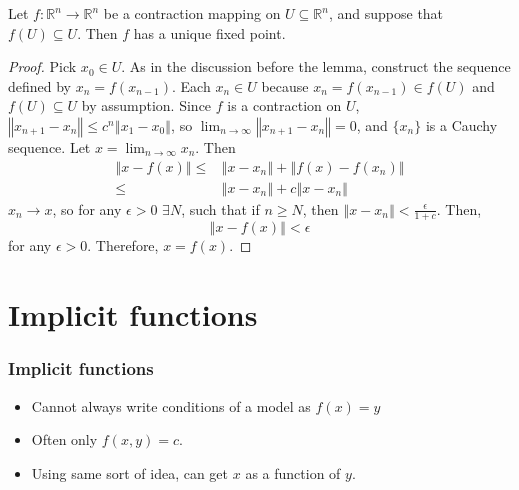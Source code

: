 \documentclass[compress]{beamer}
\def\R{\mathbb{R}}
\newcommand{\norm}[1]{\left\Vert {#1} \right\Vert}
\renewcommand{\to}{{\rightarrow}}
\begin{document}
\begin{frame}
  \begin{lemma}
    Let $f: \R^n \to \R^n$ be a contraction mapping on $U \subseteq
    \R^n$, and suppose that $f(U) \subseteq U$.  Then $f$ has a unique
    fixed point.
  \end{lemma}
  \begin{proof}
    Pick $x_0 \in U$. As in the discussion before the lemma, construct
    the sequence defined by $x_n = f(x_{n-1})$. Each $x_n \in U$ because
    $x_n = f(x_{n-1}) \in f(U)$ and $f(U) \subseteq U$ by
    assumption. Since $f$ is a contraction on $U$, $\norm{x_{n+1} - x_{n}}
    \leq c^n \norm{x_1 - x_0}$, so $\lim_{n \to \infty} \norm{x_{n+1} -
      x_{n}} = 0$, and $\{x_n\}$ is a Cauchy sequence. Let $x = \lim_{n
      \to \infty} x_n$. Then 
    \begin{align*}
      \norm{x - f(x)} \leq & \norm{x - x_n} + \norm{f(x) - f(x_n)} \\
      \leq & \norm{x - x_n} + c\norm{x - x_n}
    \end{align*}
    $x_n \to x$, so for any $\epsilon > 0$ $\exists N$, such that if $n
    \geq N$, then $\norm{x - x_n} < \frac{\epsilon}{1+c}$. Then,
    \[ \norm{x - f(x)} < \epsilon \]
    for any $\epsilon>0$. Therefore, $x = f(x)$. 
  \end{proof}
\end{frame}

\section{Implicit functions}

\begin{frame}
  \frametitle{Implicit functions}
  \begin{itemize}
  \item Cannot always write conditions of a model as $f(x) = y$ 
  \item Often only $f(x,y) = c$.
  \item Using same sort of idea, can get $x$ as a function of $y$.
  \end{itemize}
\end{frame}
\end{document}
